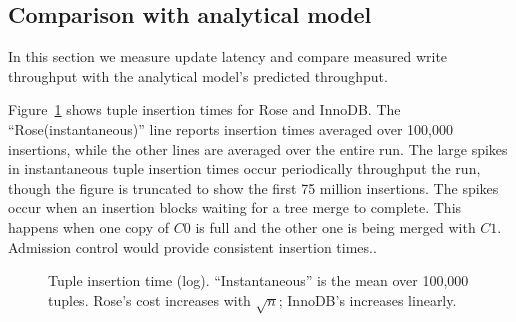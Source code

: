 \documentclass{vldb}
\newcommand{\rows}{Rose\xspace}
\newcommand{\rowss}{Rose's\xspace}
\newcommand{\xxx}[1]{\textcolor{red}{\bf XXX: #1}}
\renewcommand{\xxx}[1]{\xspace}
\begin{document}


\subsection{Comparison with analytical model}

In this section we measure update latency and compare
measured write throughput with the analytical model's predicted
throughput.

Figure~\ref{fig:avg-tup} shows tuple insertion times for \rows and InnoDB.
The ``\rows (instantaneous)'' line reports insertion times
averaged over 100,000 insertions, while the other lines are averaged
over the entire run.  The large spikes in instantaneous tuple
insertion times occur periodically throughput the run, though the
figure is truncated to show the first 75 million insertions.\xxx{show
  the whole run???}  The spikes occur when an insertion blocks waiting
for a tree merge to complete.  This happens when one copy of $C0$ is
full and the other one is being merged with $C1$.  Admission control
would provide consistent insertion times..

\begin{figure}
\centering
{}
\caption{Tuple insertion time (log).  ``Instantaneous'' is the mean over 100,000
  tuples.  \rowss cost increases with $\sqrt{n}$; InnoDB's increases linearly.}
\label{fig:avg-tup}
\end{figure}

\end{document}
